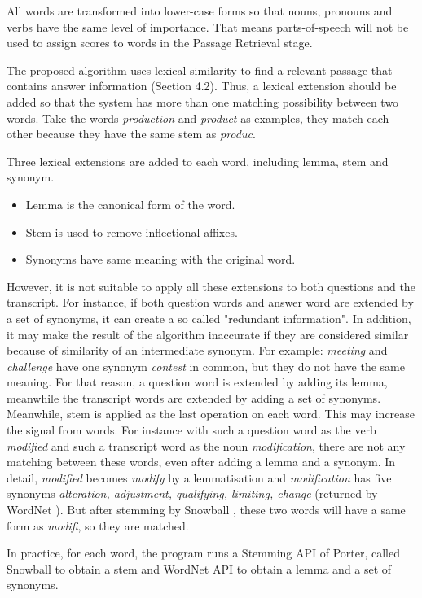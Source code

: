 All words are transformed into lower-case forms so that nouns, pronouns and verbs have the same level of importance. That means parts-of-speech will not be used to assign scores to words in the Passage Retrieval stage.

The proposed algorithm uses lexical similarity to find a relevant passage that contains answer information (Section 4.2). Thus, a lexical extension should be added so that the system has more than one matching possibility between two words. Take the words \textit{production} and \textit{product} as examples, they match each other because they have the same stem as \textit{produc}.

Three lexical extensions are added to each word, including lemma, stem and synonym. 
\begin{itemize}
\item {Lemma is the canonical form of the word.}
\item {Stem is used to remove inflectional affixes.}
\item {Synonyms have same meaning with the original word.}
\end{itemize}

However, it is not suitable to apply all these extensions to both questions and the transcript. For instance, if both question words and answer word are extended by a set of synonyms, it can create a so called "redundant information". In addition, it may make the result of the algorithm inaccurate if they are considered similar because of similarity of an intermediate synonym. For example: \textit{meeting} and \textit{challenge} have one synonym \textit{contest} in common, but they do not have the same meaning. For that reason, a question word is extended by adding its lemma, meanwhile the transcript words are extended by adding a set of synonyms. Meanwhile, stem is applied as the last operation on each word. This may increase the signal from words. For instance with such a question word as the verb \textit{modified} and such a transcript word as the noun \textit{modification}, there are not any matching between these words, even after adding a lemma and a synonym.  In detail, \textit{modified} becomes \textit{modify} by a lemmatisation and \textit{modification} has five synonyms \textit{alteration, adjustment, qualifying, limiting, change} (returned by WordNet \cite{pasca2001irw}). But after stemming by Snowball \cite{porter2001ss}, these two words will have a same form as \textit{modifi}, so they are matched.

In practice, for each word, the program runs a Stemming API of Porter, called Snowball \cite{porter2001ss} to obtain a stem and WordNet API \cite{pasca2001irw} to obtain a lemma and a set of synonyms.

